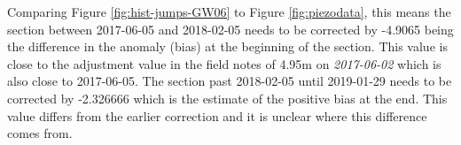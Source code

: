 \documentclass[
]{article}
\newenvironment{Shaded}{\begin{snugshade}}{\end{snugshade}}
\newcommand{\AttributeTok}[1]{\textcolor[rgb]{0.13,0.29,0.53}{#1}}
\newcommand{\CommentTok}[1]{\textcolor[rgb]{0.56,0.35,0.01}{\textit{#1}}}
\newcommand{\DecValTok}[1]{\textcolor[rgb]{0.00,0.00,0.81}{#1}}
\newcommand{\FunctionTok}[1]{\textcolor[rgb]{0.13,0.29,0.53}{\textbf{#1}}}
\newcommand{\NormalTok}[1]{#1}
\newcommand{\OtherTok}[1]{\textcolor[rgb]{0.56,0.35,0.01}{#1}}
\newcommand{\SpecialCharTok}[1]{\textcolor[rgb]{0.81,0.36,0.00}{\textbf{#1}}}
\newcommand{\StringTok}[1]{\textcolor[rgb]{0.31,0.60,0.02}{#1}}
\begin{document}
Comparing Figure \ref{fig:hist-jumps-GW06} to Figure
\ref{fig:piezodata}, this means the section between 2017-06-05 and
2018-02-05 needs to be corrected by -4.9065 being the difference in the
anomaly (bias) at the beginning of the section. This value is close to
the adjustment value in the field notes of 4.95m on \emph{2017-06-02}
which is also close to 2017-06-05. The section past 2018-02-05 until
2019-01-29 needs to be corrected by -2.326666 which is the estimate of
the positive bias at the end. This value differs from the earlier
correction and it is unclear where this difference comes from.

\begin{Shaded}
\end{Shaded}
\end{document}
